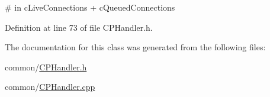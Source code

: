 \# in c\-Live\-Connections + c\-Queued\-Connections 



\-Definition at line 73 of file \-C\-P\-Handler.\-h.



\-The documentation for this class was generated from the following files\-:\begin{DoxyCompactItemize}
\item 
common/\hyperlink{_c_p_handler_8h}{\-C\-P\-Handler.\-h}\item 
common/\hyperlink{_c_p_handler_8cpp}{\-C\-P\-Handler.\-cpp}\end{DoxyCompactItemize}
